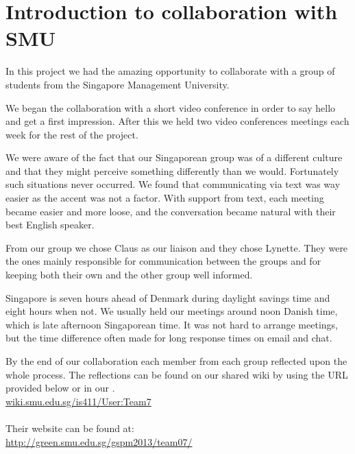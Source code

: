 \section{Introduction to collaboration with SMU}
In this project we had the amazing opportunity to collaborate with a group of students from the Singapore Management University.

We began the collaboration with a short video conference in order to say hello and get a first impression. After this we held two video conferences meetings each week for the rest of the project.

We were aware of the fact that our Singaporean group was of a different culture and that they might perceive something differently than we would. Fortunately such situations never occurred. We found that communicating via text was way easier as the accent was not a factor.
With support from text, each meeting became easier and more loose, and the conversation became natural with their best English speaker.

From our group we chose Claus as our liaison and they chose Lynette. They were the ones mainly responsible for communication between the groups and for keeping both their own and the other group well informed.

Singapore is seven hours ahead of Denmark during daylight savings time and eight hours when not. We usually held our meetings around noon Danish time, which is late afternoon Singaporean time. It was not hard to arrange meetings, but the time difference often made for long response times on email and chat.

By the end of our collaboration each member from each group reflected upon the whole process. The reflections can be found on our shared wiki by using the URL provided below or in our .
\\\url{wiki.smu.edu.sg/is411/User:Team7}\\\\

Their website can be found at:
\\\url{http://green.smu.edu.sg/gspm2013/team07/}
\newpage